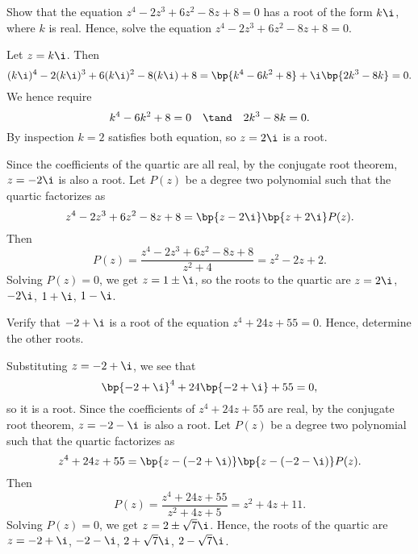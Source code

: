 \begin{problem}
    Show that the equation $z^4 - 2z^3 + 6z^2 - 8z + 8 = 0$ has a root of the form $k\i$, where $k$ is real. Hence, solve the equation $z^4 - 2z^3 + 6z^2 - 8z + 8 = 0$.
\end{problem}
\begin{solution}
    Let $z = k\i$. Then \[(k\i)^4 - 2(k\i)^3 + 6(k\i)^2 - 8(k\i) + 8 = \bp{k^4 - 6k^2 + 8} + \i\bp{2k^3 - 8k} = 0.\] We hence require \[k^4 - 6k^2 + 8 = 0 \quad \tand \quad 2k^3 - 8k = 0.\] By inspection $k = 2$ satisfies both equation, so $z = 2\i$ is a root.

    Since the coefficients of the quartic are all real, by the conjugate root theorem, $z = -2\i$ is also a root. Let $P(z)$ be a degree two polynomial such that the quartic factorizes as \[z^4 - 2z^3 + 6z^2 - 8z + 8 = \bp{z - 2\i}\bp{z + 2\i}P(z).\] Then \[P(z) = \frac{z^4 - 2z^3 + 6z^2 - 8z + 8}{z^2 + 4} = z^2 - 2z + 2.\] Solving $P(z) = 0$, we get $z = 1 \pm \i$, so the roots to the quartic are $z = 2\i$, $-2\i$, $1 + \i$, $1 - \i$.
\end{solution}

\clearpage
\begin{problem}
    Verify that $-2 + \i$ is a root of the equation $z^4 + 24z + 55 = 0$. Hence, determine the other roots.
\end{problem}
\begin{solution}
    Substituting $z = -2 + \i$, we see that \[\bp{-2 + \i}^4 + 24\bp{-2 + \i} + 55 = 0,\] so it is a root. Since the coefficients of $z^4 + 24 z + 55$ are real, by the conjugate root theorem, $z = -2 - \i$ is also a root. Let $P(z)$ be a degree two polynomial such that the quartic factorizes as \[z^4 + 24z + 55 = \bp{z - (-2+\i)}\bp{z - (-2-\i)}P(z).\] Then \[P(z) = \frac{z^4 + 24z + 55}{z^2 + 4z + 5} = z^2 + 4z + 11.\] Solving $P(z) = 0$, we get $z = 2 \pm \sqrt{7} \i$. Hence, the roots of the quartic are $z = -2 + \i$, $-2-\i$, $2 + \sqrt{7} \i$, $2 - \sqrt{7} \i$.
\end{solution}